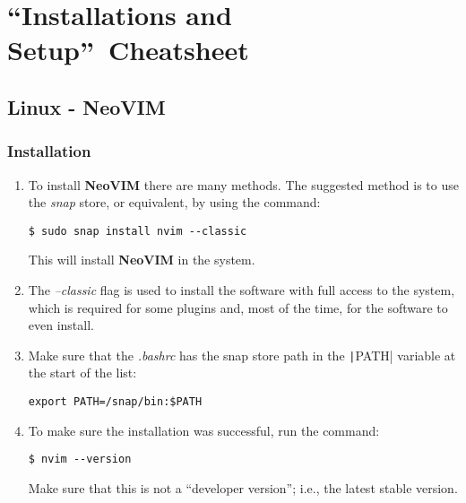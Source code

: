 \section{\textquotedblleft Installations and Setup\textquotedblright\
Cheatsheet
}


\subsection{Linux - NeoVIM}

\subsubsection{Installation}

\begin{enumerate}
    \item To install \textbf{NeoVIM} there are many methods. The suggested
    method is to use the \textit{snap} store, or equivalent, by using the
    command:
    \begin{verbatim}
$ sudo snap install nvim --classic
    \end{verbatim}
    This will install \textbf{NeoVIM} in the system.
    \item The \textit{--classic} flag is used to install the software with
    full access to the system, which is required for some plugins and, most of
    the time, for the software to even install.
    \item Make sure that the
    \textit{.bashrc} has the snap store path in the \texttt|PATH|
    variable at the start of the list:
    \begin{verbatim}
export PATH=/snap/bin:$PATH
    \end{verbatim}
    \item To make sure the installation was successful, run the command:
    \begin{verbatim}
$ nvim --version
    \end{verbatim}
    Make sure that this is not a \textquotedblleft developer 
    version\textquotedblright; i.e., the latest stable version.
\end{enumerate}

